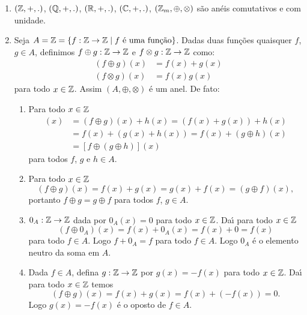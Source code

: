 \begin{exemplos}
    \begin{enumerate}[label={\arabic*})]
        \item $(\mathbb{Z},+,.)$, $(\mathbb{Q},+,.)$, $(\mathbb{R},+,.)$, $(\mathbb{C},+,.)$, $(\mathbb{Z}_m, \oplus, \otimes)$ s{\~a}o an{\'e}is comutativos e com unidade.

        \item  Seja $A = \z =\{f : \z \to \z \mid f \mbox{ {\'e} uma fun{\c c}{\~a}o}\}$. Dadas duas fun{\c c}{\~o}es quaisquer $f$, $g \in A$, definimos $f\oplus g:\mathbb{Z} \to \mathbb{Z}$ e
            $f \otimes g:\mathbb{Z} \to \mathbb{Z}$ como:
        \begin{align*}
            (f\oplus g)(x) &= f(x) + g(x)\\
            (f\otimes g)(x) &= f(x)g(x)
        \end{align*}
        para todo $x \in \mathbb{Z}$. Assim $(A, \oplus, \otimes)$ \'e um anel. De fato:
        \begin{enumerate}[label={\roman*})]
            \item Para todo $x \in \mathbb{Z}$
            \begin{align*}
                [(f \oplus g) \oplus h](x) &= (f \oplus g)(x) + h(x) = (f(x) + g(x)) + h(x)\\
                &= f(x) + (g(x) + h(x)) = f(x) + (g \oplus h)(x)\\ &= [f \oplus (g \oplus h)](x)
            \end{align*}
            para todos $f$, $g$ e $h \in A$.

            \item Para todo $x \in \mathbb{Z}$
            \[
                (f\oplus g)(x) = f(x) + g(x) = g(x) + f(x) = (g\oplus f)(x),
            \]
            portanto $f\oplus g = g\oplus f$ para todos $f$, $g \in A$.

            \item $0_A : \mathbb{Z} \to \mathbb{Z}$ dada por $0_A(x) = 0$ para todo $x \in \mathbb{Z}$. Da{\'\i} para todo $x \in \mathbb{Z}$
            \[
                (f \oplus 0_A)(x) = f(x) + 0_A(x) = f(x) + 0 = f(x)
            \]
            para todo $f \in A$. Logo $f + 0_A = f$ para todo $f \in A$. Logo $0_A$ \'e o elemento neutro da soma em $A$.

            \item Dada $f \in A$, defina $g : \mathbb{Z} \to \mathbb{Z}$ por $g(x) = -f(x)$ para todo $x \in \mathbb{Z}$. Da{\'\i} para todo $x \in \mathbb{Z}$ temos
            \[
                (f \oplus g)(x) = f(x) + g(x) = f(x) + (-f(x)) = 0.
            \]
            Logo $g(x) = -f(x)$ \'e o oposto de $f \in A$.


\end{enumerate}
\end{enumerate}
\end{exemplos}
